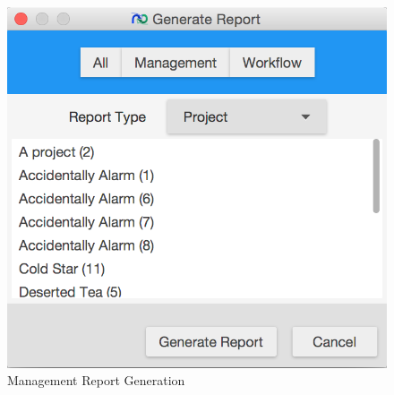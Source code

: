 \begin{figure}[H]
\centering
\includegraphics[width=\textwidth]{images/screenshots/report2.PNG}
\caption{Management Report Generation}
\label{fig:generate_report_management}
\end{figure}
